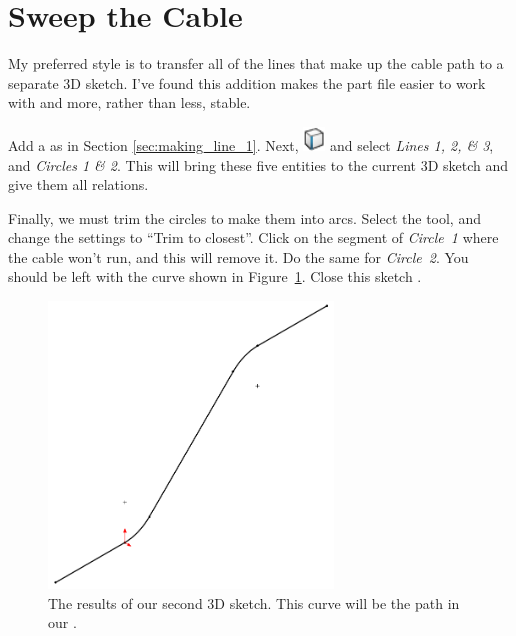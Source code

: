 \section{Sweep the Cable}

\label{sec:second-3d-sketch}

My preferred style is to transfer all of the lines that make up the cable path
to a separate 3D sketch. I've found this addition makes the part file easier to
work with and more, rather than less, stable.

Add a  as in Section \ref{sec:making_line_1}. Next,  \includegraphics{images/symbols/convert-entities.png} and select \emph{Lines 1, 2, \& 3}, and \emph{Circles 1 \& 2}. This will bring these five
entities to the current 3D sketch and give them all  relations.

Finally, we must trim the circles to make them into arcs. Select the 
tool, and change the settings to ``Trim to closest''. Click on the segment
of \emph{Circle~1} where the cable won't run, and this will remove it. Do the same for
\emph{Circle~2}. You should be left with the curve shown in Figure~\ref{fig:second-3d-sketch}. Close this sketch
.

\begin{figure}[H]
\begin{center}
\includegraphics[height=3in]{images/figures/second-3d-sketch.png}
\end{center}
\caption{The results of our second 3D sketch. This curve will be the path in our
.
\label{fig:second-3d-sketch}}

\end{figure}

